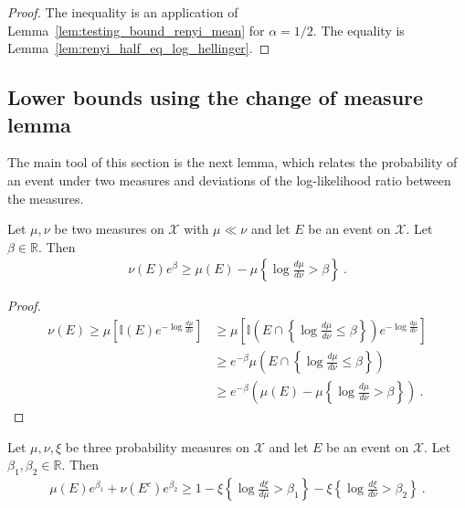 \begin{proof}
The inequality is an application of Lemma~\ref{lem:testing_bound_renyi_mean} for $\alpha = 1/2$. The equality is Lemma~\ref{lem:renyi_half_eq_log_hellinger}.
\end{proof}



\subsection{Lower bounds using the change of measure lemma}

The main tool of this section is the next lemma, which relates the probability of an event under two measures and deviations of the log-likelihood ratio between the measures.

\begin{lemma}
  \label{lem:llr_change_measure}
  \leanok
  Let $\mu, \nu$ be two measures on $\mathcal X$ with $\mu \ll \nu$ and let $E$ be an event on $\mathcal X$. Let $\beta \in \mathbb{R}$. Then
  \begin{align*}
  \nu(E) e^{\beta} \ge \mu(E) - \mu\left\{ \log\frac{d \mu}{d \nu} > \beta \right\} \: .
  \end{align*}
\end{lemma}

\begin{proof}\leanok
\begin{align*}
\nu(E)
\ge \mu\left[\mathbb{I}(E) e^{- \log\frac{d \mu}{d \nu} }\right]
&\ge \mu\left[\mathbb{I}\left(E \cap \left\{\log\frac{d \mu}{d \nu} \le \beta\right\}\right) e^{- \log\frac{d \mu}{d \nu} }\right]
\\
&\ge e^{- \beta}\mu\left(E \cap \left\{\log\frac{d \mu}{d \nu} \le \beta\right\}\right)
\\
&\ge e^{- \beta}\left( \mu(E) - \mu\left\{ \log\frac{d \mu}{d \nu} > \beta \right\} \right)
\: .
\end{align*}
\end{proof}


\begin{lemma}
  \label{lem:llr_change_measure_add}
  \leanok
  Let $\mu, \nu, \xi$ be three probability measures on $\mathcal X$ and let $E$ be an event on $\mathcal X$. Let $\beta_1, \beta_2 \in \mathbb{R}$. Then
  \begin{align*}
  \mu(E) e^{\beta_1} + \nu(E^c) e^{\beta_2} \ge 1 - \xi\left\{ \log\frac{d \xi}{d \mu} > \beta_1 \right\} - \xi\left\{ \log\frac{d \xi}{d \nu} > \beta_2 \right\} \: .
  \end{align*}
\end{lemma}

